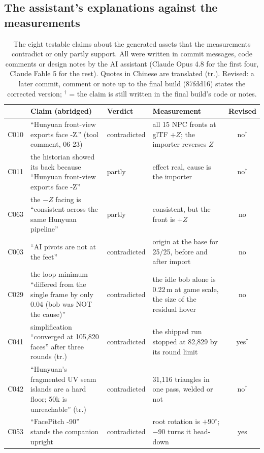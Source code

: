 \subsection{The assistant's explanations against the measurements}
\label{sec:claims}

\begin{table}[t]
\caption{The eight testable claims about the generated assets that the measurements contradict or
only partly support. All were written in commit messages, code comments or design notes by the AI
assistant (Claude Opus 4.8 for the first four, Claude Fable 5 for the rest). Quotes in Chinese are
translated (tr.). Revised: a later commit, comment or note up to the final build (87fdd16) states the
corrected version; $^\dagger$ = the claim is still written in the final build's code or notes.}
\label{tab:claims}
\small
\begin{tabularx}{\textwidth}{@{}lYlYc@{}}
\toprule
& Claim (abridged) & Verdict & Measurement & Revised \\
\midrule
C010 & ``Hunyuan front-view exports face -Z.'' (tool comment, 06-23) & contradicted & all 15 NPC fronts at glTF $+Z$; the importer reverses $Z$ & no$^\dagger$ \\
C011 & the historian showed its back because ``Hunyuan front-view exports face -Z'' & partly & effect real, cause is the importer & no$^\dagger$ \\
C063 & the $-Z$ facing is ``consistent across the same Hunyuan pipeline'' & partly & consistent, but the front is $+Z$ & no \\
C003 & ``AI pivots are not at the feet'' & contradicted & origin at the base for 25/25, before and after import & no \\
C029 & the loop minimum ``differed from the single frame by only 0.04 (bob was NOT the cause)'' & contradicted & the idle bob alone is 0.22\,m at game scale, the size of the residual hover & no \\
C041 & simplification ``converged at 105,820 faces'' after three rounds (tr.) & contradicted & the shipped run stopped at 82,829 by its round limit & yes$^\dagger$ \\
C042 & ``Hunyuan's fragmented UV seam islands are a hard floor; 50k is unreachable'' (tr.) & contradicted & 31,116 triangles in one pass, welded or not & no$^\dagger$ \\
C053 & ``FacePitch -90'' stands the companion upright & contradicted & root rotation is $+90^\circ$; $-90$ turns it head-down & yes \\
\bottomrule
\end{tabularx}
\end{table}

